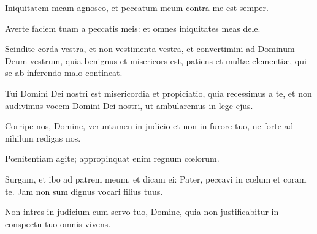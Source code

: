 \begin{multicols}{2}
	Iniquitatem meam agnosco, et peccatum meum contra me est semper.
	
	Averte faciem tuam a peccatis meis: et omnes iniquitates meas dele.
	
	Scindite corda vestra, et non vestimenta vestra, et convertimini ad Dominum Deum vestrum, quia benignus et misericors est, patiens et mult{\ae} clementi{\ae}, qui se ab inferendo malo contineat.
	
	Tui Domini Dei nostri est misericordia et propiciatio, quia recessimus a te, et non audivimus vocem Domini Dei nostri, ut ambularemus in lege ejus.
	
	Corripe nos, Domine, veruntamen in judicio et non in furore tuo, ne forte ad nihilum redigas nos.
	
	P{\oe}nitentiam agite; appropinquat enim regnum c{\oe}lorum.
	
	Surgam, et ibo ad patrem meum, et dicam ei: Pater, peccavi in c{\oe}lum et coram te. Jam non sum dignus vocari filius tuus.
	
	Non intres in judicium cum servo tuo, Domine, quia non justificabitur in conspectu tuo omnis vivens.
	

\end{multicols}
